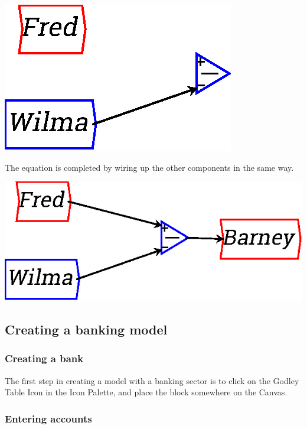 \begin{center}
\includegraphics{images/NewItem181.eps} 
\end{center}


The equation is completed by wiring up the other components in the same way.

\begin{center}
\includegraphics{images/NewItem182.eps} 
\end{center}


\subsection{Creating a banking model}
\label{creatingBankingModel}

\subsubsection{Creating a bank}

The first step in creating a model with a banking sector is to click on the Godley Table Icon in the Icon Palette, and place the block somewhere on the Canvas.

\subsubsection{Entering accounts}

